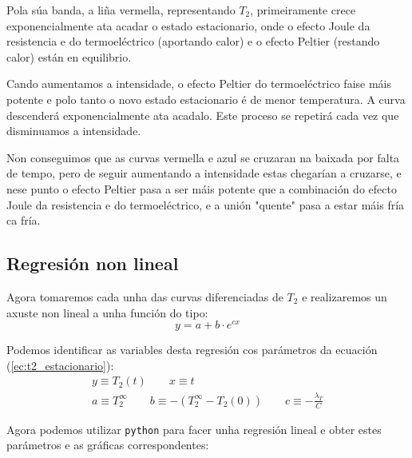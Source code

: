 \documentclass[12pt, a4paper, titlepage]{article}
\begin{document}
  Pola súa banda, a liña vermella, representando $T_2$, primeiramente crece exponencialmente ata acadar o estado estacionario, onde o efecto Joule da resistencia e do termoeléctrico (aportando calor) e o efecto Peltier (restando calor) están en equilibrio.

  Cando aumentamos a intensidade, o efecto Peltier do termoeléctrico faise máis potente e polo tanto o novo estado estacionario é de menor temperatura. A curva descenderá exponencialmente ata acadalo. Este proceso se repetirá cada vez que disminuamos a intensidade.

  Non conseguimos que as curvas vermella e azul se cruzaran na baixada por falta de tempo, pero de seguir aumentando a intensidade estas chegarían a cruzarse, e nese punto o efecto Peltier pasa a ser máis potente que a combinación do efecto Joule da resistencia e do termoeléctrico, e a unión "quente" pasa a estar máis fría ca fría.

  \subsection{Regresión non lineal}

  Agora tomaremos cada unha das curvas diferenciadas de $T_2$ e realizaremos un axuste non lineal a unha función do tipo:
  \begin{equation}
    y = a + b \cdot e^{cx}
  \end{equation}

  Podemos identificar as variables desta regresión cos parámetros da ecuación (\ref{ec:t2_estacionario}):
  \begin{gather}
    y \equiv T_2(t) \qquad x \equiv t \nonumber \\
    a \equiv T_2^\infty \qquad b \equiv -(T_2^\infty - T_2(0)) \qquad c \equiv -\frac{\lambda_T}{C} \label{ec:equivalencias_ajuste}
  \end{gather}

  Agora podemos utilizar \texttt{python} para facer unha regresión lineal e obter estes parámetros e as gráficas correspondentes:
\end{document}
